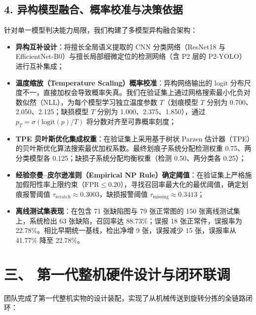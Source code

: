 \subsection*{4. 异构模型融合、概率校准与决策依据}
针对单一模型判决能力局限，我们构建了多模型异构融合架构：
\begin{itemize}
    \item \textbf{异构互补设计}：将擅长全局语义提取的 CNN 分类网络（ResNet18 与 EfficientNet-B0）与擅长局部细微定位的检测网络（含 P2 层的 P2-YOLO）进行互补集成；
    \item \textbf{温度缩放（Temperature Scaling）概率校准}：异构网络输出的 logit 分布尺度不一，直接加权会导致概率失真。我们在验证集上通过网格搜索最小化负对数似然（NLL），为每个模型学习独立温度参数 $T$（划痕模型 $T$ 分别为 0.700、2.050、2.125；缺损模型 $T$ 分别为 1.000、2.375、1.850），通过 $p_T = \sigma(\text{logit}(p)/T)$ 将分数对齐至可靠概率刻度；
    \item \textbf{TPE 贝叶斯优化集成权重}：在验证集上采用基于树状 Parzen 估计器（TPE）的贝叶斯优化算法搜索最优加权系数。最终划痕子系统分配检测权重 0.75、两分类模型各 0.125；缺损子系统分配均衡权重（检测 0.50、两分类各 0.25）；
    \item \textbf{经验奈曼–皮尔逊准则（Empirical NP Rule）确定阈值}：在验证集上严格施加假阳性率上限约束（$\text{FPR} \le 0.20$），寻找召回率最大化的最优阈值，确定划痕报警阈值 $\tau_{\text{scratch}} \approx 0.3003$，缺损报警阈值 $\tau_{\text{missing}} \approx 0.3413$；
    \item \textbf{离线测试集表现}：在包含 71 张缺陷图与 79 张正常图的 150 张离线测试集上，系统检出 63 张缺陷，召回率达 88.73\%；误报 18 张正常件，误报率为 22.78\%。相比早期统一基线，检出净增 9 张，误报减少 15 张，误报率从 41.77\% 降至 22.78\%。
\end{itemize}

\section*{三、 第一代整机硬件设计与闭环联调}

团队完成了第一代整机实物的设计装配，实现了从机械传送到旋转分拣的全链路闭环：

